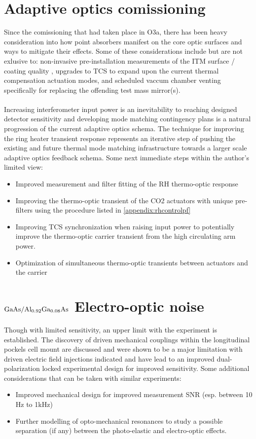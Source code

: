 
\section{Adaptive optics comissioning}
Since the comissioning that had taken place in O3a, there has been heavy consideration into how point absorbers manifest on the core optic surfaces and ways to mitigate their effects. Some of these considerations include but are not exlusive to: non-invasive pre-installation measurements of the ITM surface / coating quality \cite{dcc:paNSFupdate2022}, upgrades to TCS to expand upon the current thermal compensation actuation modes, and scheduled vaccum chamber venting specifically for replacing the offending test mass mirror(s). 
\\
\\
Increasing interferometer input power is an inevitability to reaching designed detector sensitivity and developing mode matching contingency plans is a natural progression of the current adaptive optics schema. The technique for improving the ring heater transient response represents an iterative step of pushing the existing and future thermal mode matching infrastructure towards a larger scale adaptive optics feedback schema. Some next immediate steps within the author's limited view:

\begin{itemize}
	\item Improved measurement and filter fitting of the RH thermo-optic response
	\item Improving the thermo-optic transient of the CO2 actuators with unique pre-filters using the procedure listed in \autoref{appendix:rhcontrolpf} 
	\item Improving TCS synchronization when raising input power to potentially improve the thermo-optic carrier transient from the high circulating arm power.
	\item Optimization of simultaneous thermo-optic transients between actuators and the carrier 
\end{itemize}

\section{\texorpdfstring{$\mathrm{GaAs} / \mathrm{Al_{0.92}Ga_{0.08}As}$}{gaas/algaas} Electro-optic noise}
Though with limited sensitivity, an upper limit with the experiment is established. The discovery of driven mechanical couplings within the longitudinal pockels cell mount are discussed and were shown to be a major limitation with driven electric field injections indicated and have lead to an improved dual-polarization locked experimental design for improved sensitivity. Some additional considerations that can be taken with similar experiments:

\begin{itemize}
	\item Improved mechanical design for improved measurement SNR (esp. between 10 Hz to 1kHz)
	\item Further modelling of opto-mechanical resonances to study a possible separation (if any) between the photo-elastic and electro-optic effects.  
\end{itemize}

